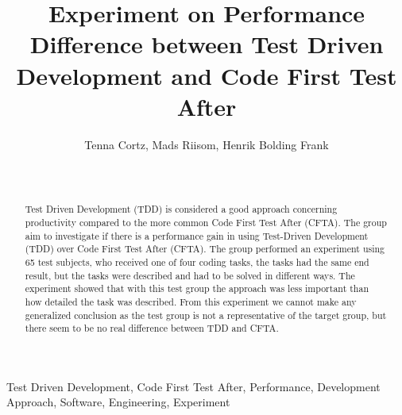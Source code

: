 \documentclass{sig-alternate-05-2015}
\begin{document}
	

\title{Experiment on Performance Difference between Test Driven Development and Code First Test After}

\author{
\alignauthor
Tenna Cortz, Mads Riisom, Henrik Bolding Frank\\
 \\
 \\
}


\maketitle
\begin{abstract}
Test Driven Development (TDD) is considered a good approach concerning productivity compared to the more common Code First Test After (CFTA). The group aim to investigate if there is a performance gain in using Test-Driven Development (TDD) over Code First Test After (CFTA). The group performed an experiment using 65 test subjects, who received one of four coding tasks, the tasks had the same end result, but the tasks were described and had to be solved in different ways.
The experiment showed that with this test group the approach was less important than how detailed the task was described.
From this experiment we cannot make any generalized conclusion as the test group is not a representative of the target group, but there seem to be no real difference between TDD and CFTA.

\end{abstract}


\begin{keywords}
Test Driven Development, Code First Test After, Performance, Development Approach, Software, Engineering, Experiment

\end{keywords}
\end{document}
